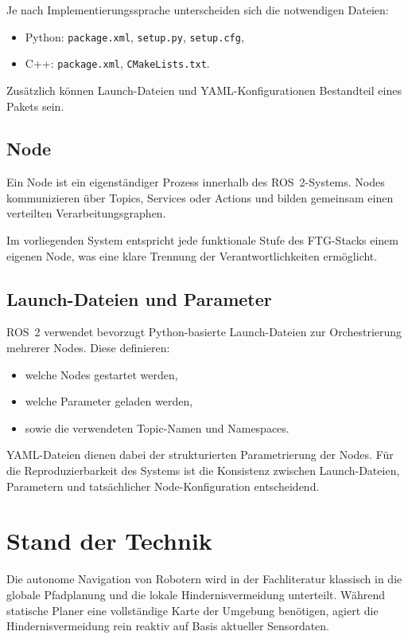 Je nach Implementierungssprache unterscheiden sich die notwendigen
Dateien:
\begin{itemize}
    \item Python: \texttt{package.xml}, \texttt{setup.py},
    \texttt{setup.cfg},
    \item C++: \texttt{package.xml}, \texttt{CMakeLists.txt}.
\end{itemize}

Zusätzlich können Launch-Dateien und YAML-Konfigurationen Bestandteil
eines Pakets sein.

\subsection{Node}

Ein Node ist ein eigenständiger Prozess innerhalb des ROS~2-Systems.
Nodes kommunizieren über Topics, Services oder Actions und bilden
gemeinsam einen verteilten Verarbeitungsgraphen.

Im vorliegenden System entspricht jede funktionale Stufe des
FTG-Stacks einem eigenen Node, was eine klare Trennung der
Verantwortlichkeiten ermöglicht.

\subsection{Launch-Dateien und Parameter}

ROS~2 verwendet bevorzugt Python-basierte Launch-Dateien zur
Orchestrierung mehrerer Nodes. Diese definieren:
\begin{itemize}
    \item welche Nodes gestartet werden,
    \item welche Parameter geladen werden,
    \item sowie die verwendeten Topic-Namen und Namespaces.
\end{itemize}

YAML-Dateien dienen dabei der strukturierten Parametrierung der Nodes.
Für die Reproduzierbarkeit des Systems ist die Konsistenz zwischen
Launch-Dateien, Parametern und tatsächlicher Node-Konfiguration
entscheidend.\section{Stand der Technik}

Die autonome Navigation von Robotern wird in der Fachliteratur klassisch in die globale Pfadplanung und die lokale Hindernisvermeidung unterteilt. Während statische Planer eine vollständige Karte der Umgebung benötigen, agiert die Hindernisvermeidung rein reaktiv auf Basis aktueller Sensordaten.


